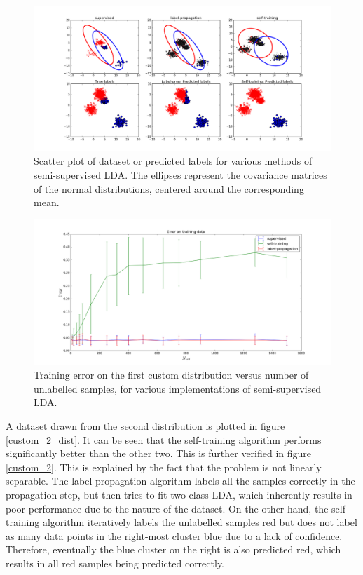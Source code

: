 \documentclass [a4paper] {report}
\begin{document}
	\begin{figure}[H]
		\begin{center}
			\includegraphics[scale=0.3]{Images/custom1.png}
			\caption{Scatter plot of dataset or predicted labels for various methods of semi-supervised LDA. The ellipses represent the covariance matrices of the normal distributions, centered around the corresponding mean.}
			\label{custom_1_dist}
		\end{center}
	\end{figure}	
	
	\begin{figure}[H]
		\begin{center}
			\includegraphics[scale=0.3]{Images/custom1_train_error.png}
			\caption{Training error on the first custom distribution versus number of unlabelled samples, for various implementations of semi-supervised LDA.}
			\label{custom_1}
		\end{center}
	\end{figure}
	
	A dataset drawn from the second distribution is plotted in figure \ref{custom_2_dist}. It can be seen that the self-training algorithm performs significantly better than the other two. This is further verified in figure \ref{custom_2}. This is explained by the fact that the problem is not linearly separable. The label-propagation algorithm labels all the samples correctly in the propagation step, but then tries to fit two-class LDA, which inherently results in poor performance due to the nature of the dataset. On the other hand, the self-training algorithm iteratively labels the unlabelled samples red but does not label as many data points in the right-most cluster blue due to a lack of confidence. Therefore, eventually the blue cluster on the right is also predicted red, which results in all red samples being predicted correctly.
	
\end{document}
